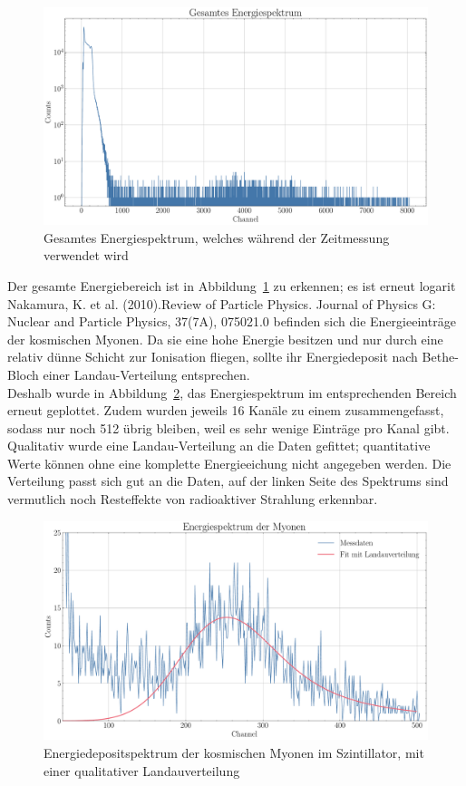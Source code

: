 \documentclass[12pt,a4paper,ngerman]{report}
\begin{document}
	\begin{figure}[ht]
		\centering
		\includegraphics[width=\textwidth]{Bilder/gesamterEnBereich.pdf}		
		\caption[Energiespektrum]{Gesamtes Energiespektrum, welches während der Zeitmessung verwendet wird}
		\label{img:gesamterEnBereich}
	\end{figure}
	Der gesamte Energiebereich ist in Abbildung~\ref{img:gesamterEnBereich} zu erkennen; es ist erneut logarit		Nakamura, K. et al. (2010).\@ Review of Particle Physics. Journal of Physics G: Nuclear and Particle Physics, 37(7A), 075021.0 befinden sich die Energieeinträge der kosmischen Myonen. Da sie eine hohe Energie besitzen und nur durch eine relativ dünne Schicht zur Ionisation fliegen, sollte ihr Energiedeposit nach Bethe-Bloch einer Landau-Verteilung entsprechen.\\
	Deshalb wurde in Abbildung~\ref{img:MyonenLandau}, das Energiespektrum im entsprechenden Bereich erneut geplottet. Zudem wurden jeweils 16 Kanäle zu einem zusammengefasst, sodass nur noch 512 übrig bleiben, weil es sehr wenige Einträge pro Kanal gibt. Qualitativ wurde eine Landau-Verteilung an die Daten gefittet; quantitative Werte können ohne eine komplette Energieeichung nicht angegeben werden. Die Verteilung passt sich gut an die Daten, auf der linken Seite des Spektrums sind vermutlich noch Resteffekte von radioaktiver Strahlung erkennbar. 
	\begin{figure}[ht]
		\centering
		\includegraphics[width=\textwidth]{Bilder/MyonenLandau.pdf}		
		\caption[Energiedepositspektrum]{Energiedepositspektrum der kosmischen Myonen im Szintillator, mit einer qualitativer Landauverteilung}
		\label{img:MyonenLandau}
	\end{figure}
\end{document}
